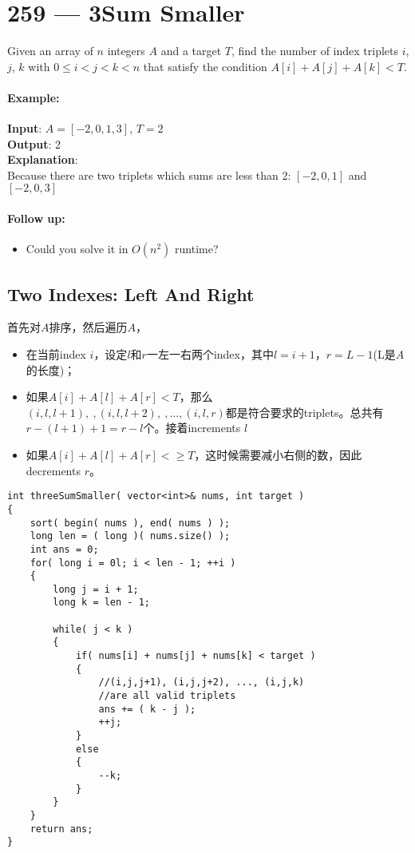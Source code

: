 \section{259 --- 3Sum Smaller}
Given an array of $n$ integers $A$ and a target $T$, find the number of index triplets $i$, $j$, $k$ with $0 \leq i < j < k < n$ that satisfy the condition $A[i] + A[j] + A[k] < T$.
\par
\paragraph{Example:}
\begin{flushleft}
\textbf{Input}: $A = [-2, 0, 1, 3]$, $T = 2$
\\
\textbf{Output}: 2
\\
\textbf{Explanation}:
\\
Because there are two triplets which sums are less than 2: $[-2, 0, 1]$ and $[-2, 0, 3]$
\end{flushleft}
\paragraph{Follow up:}
\begin{itemize}
\item Could you solve it in $O(n^2)$ runtime?
\end{itemize}
\subsection{Two Indexes: Left And Right}
首先对$A$排序，然后遍历$A$，
\begin{itemize}
\item 在当前index $i$，设定$l$和$r$一左一右两个index，其中$l=i+1$，$r=L-1$(L是$A$的长度)；
\item 如果$A[i]+A[l]+A[r]<T$，那么$(i, l, l+1),\ ,(i,l,l+2),\ ,\ldots, (i,l,r)$都是符合要求的triplets。总共有$r-(l+1)+1=r-l$个。接着increments  $l$
\item 如果$A[i]+A[l]+A[r]<\geq T$，这时候需要减小右侧的数，因此decrements $r$。
\end{itemize}


\setcounter{lstlisting}{0}
\begin{lstlisting}[style=customc, caption={Two Pointers}]
int threeSumSmaller( vector<int>& nums, int target )
{
    sort( begin( nums ), end( nums ) );
    long len = ( long )( nums.size() );
    int ans = 0;
    for( long i = 0l; i < len - 1; ++i )
    {
        long j = i + 1;
        long k = len - 1;

        while( j < k )
        {
            if( nums[i] + nums[j] + nums[k] < target )
            {
                //(i,j,j+1), (i,j,j+2), ..., (i,j,k)
                //are all valid triplets
                ans += ( k - j );
                ++j;
            }
            else
            {
                --k;
            }
        }
    }
    return ans;
}
\end{lstlisting}